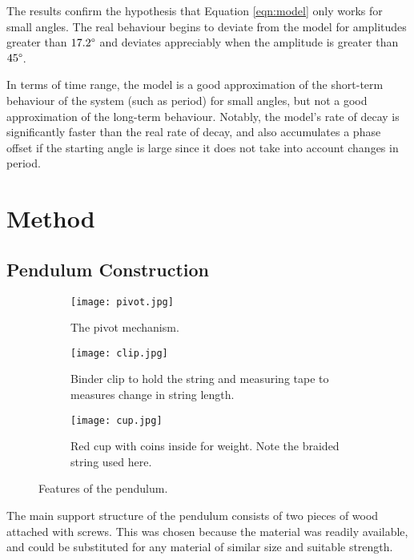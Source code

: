 \documentclass[aps,twocolumn,secnumarabic,nobalancelastpage,amsmath,amssymb,nofootinbib,floatfix,letterpaper]{revtex4}
\begin{document}
The results confirm the hypothesis that Equation \ref{eqn:model} only works for small angles. The real behaviour begins to
deviate from the model for amplitudes greater than \(17.2\degree\) and deviates appreciably when the amplitude is
greater than \(45\degree\).

In terms of time range, the model is a good approximation of the short-term behaviour of the system (such as period)
for small angles, but not a good approximation of the long-term behaviour. Notably, the model's rate of decay is
significantly faster than the real rate of decay, and also accumulates a phase offset if the starting angle is large
since it does not take into account changes in period.


\section{Method}

\subsection{Pendulum Construction}

\begin{figure}[htb]
    \centering
    \begin{subfigure}{\linewidth}
        \texttt{[image: pivot.jpg]}
        \caption{The pivot mechanism.}
        \label{fig:pivot}
    \end{subfigure}
    \begin{subfigure}[t]{0.49\linewidth}
        \texttt{[image: clip.jpg]}
        \caption{Binder clip to hold the string and measuring tape to measures change in string length.}
        \label{fig:clip}
    \end{subfigure}
    \begin{subfigure}[t]{0.49\linewidth}
        \texttt{[image: cup.jpg]}
        \caption{Red cup with coins inside for weight. Note the braided string used here.}
        \label{fig:cup}
    \end{subfigure}
    \caption{Features of the pendulum.}
\end{figure}

The main support structure of the pendulum consists of two pieces of wood attached with screws.
This was chosen because the material was readily available, and could be substituted for any material of
similar size and suitable strength.
\end{document}
